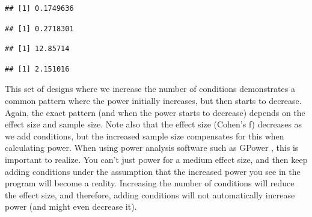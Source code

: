 \documentclass[
]{book}
\newenvironment{Shaded}{\begin{snugshade}}{\end{snugshade}}
\newcommand{\KeywordTok}[1]{\textcolor[rgb]{0.13,0.29,0.53}{\textbf{#1}}}
\newcommand{\NormalTok}[1]{#1}
\newcommand{\OperatorTok}[1]{\textcolor[rgb]{0.81,0.36,0.00}{\textbf{#1}}}
\begin{document}
\begin{verbatim}
## [1] 0.1749636
\end{verbatim}

\begin{Shaded}
\end{Shaded}

\begin{verbatim}
## [1] 0.2718301
\end{verbatim}

\begin{Shaded}
\end{Shaded}

\begin{verbatim}
## [1] 12.85714
\end{verbatim}

\begin{Shaded}
\end{Shaded}

\begin{verbatim}
## [1] 2.151016
\end{verbatim}

This set of designs where we increase the number of conditions demonstrates a common pattern where the power initially increases, but then starts to decrease. Again, the exact pattern (and when the power starts to decrease) depends on the effect size and sample size. Note also that the effect size (Cohen's f) decreases as we add conditions, but the increased sample size compensates for this when calculating power. When using power analysis software such as GPower \citep{faul2007g}, this is important to realize. You can't just power for a medium effect size, and then keep adding conditions under the assumption that the increased power you see in the program will become a reality. Increasing the number of conditions will reduce the effect size, and therefore, adding conditions will not automatically increase power (and might even decrease it).
\end{document}
